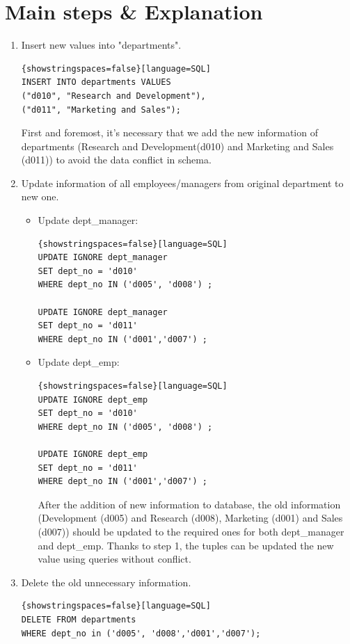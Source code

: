 \documentclass{article}
\begin{document}
\section*{Main steps \& Explanation}
\begin{enumerate}
	\item Insert new values into "departments". 
	\begin{lstlisting}{showstringspaces=false}[language=SQL]
INSERT INTO departments VALUES
("d010", "Research and Development"),
("d011", "Marketing and Sales");
	\end{lstlisting}
	First and foremost, it's necessary that we add the new information of departments (Research and
Development(d010) and Marketing and Sales (d011)) to avoid the data conflict in schema.

	\item Update information of all employees/managers from original department to new one.\\
	\begin{itemize}
		\item Update dept\_manager:
		\begin{lstlisting}{showstringspaces=false}[language=SQL]
UPDATE IGNORE dept_manager
SET dept_no = 'd010'
WHERE dept_no IN ('d005', 'd008') ;
	
UPDATE IGNORE dept_manager
SET dept_no = 'd011'
WHERE dept_no IN ('d001','d007') ;
	\end{lstlisting}
		\item Update dept\_emp:
		\begin{lstlisting}{showstringspaces=false}[language=SQL]
UPDATE IGNORE dept_emp
SET dept_no = 'd010'
WHERE dept_no IN ('d005', 'd008') ;
	
UPDATE IGNORE dept_emp
SET dept_no = 'd011'
WHERE dept_no IN ('d001','d007') ;
	\end{lstlisting}
	
After the addition of new information to database, the old information (Development (d005) and Research (d008), Marketing (d001) and Sales (d007)) should be updated to the required ones for both dept\_manager and dept\_emp. Thanks to step 1, the tuples can be updated the new value using queries without conflict. 

	\end{itemize}
	\item Delete the old unnecessary information.
	\begin{lstlisting}{showstringspaces=false}[language=SQL]
DELETE FROM departments 
WHERE dept_no in ('d005', 'd008','d001','d007');
	\end{lstlisting}

\end{enumerate}
\end{document}
